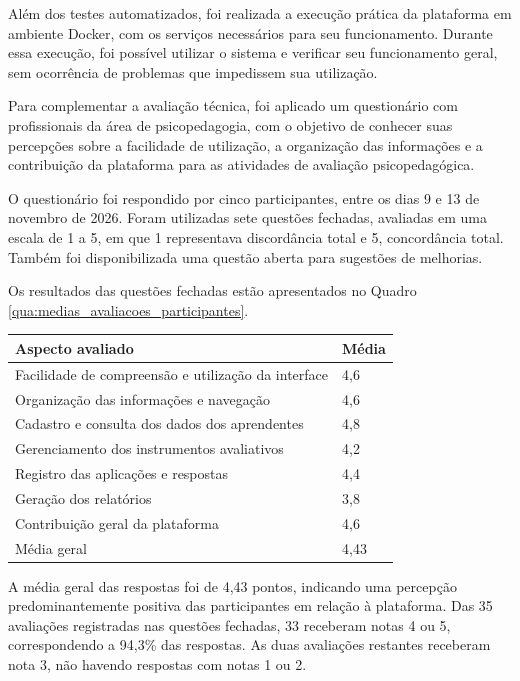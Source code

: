 Além dos testes automatizados, foi realizada a execução prática da plataforma em ambiente Docker, com os serviços necessários para seu funcionamento. Durante essa execução, foi possível utilizar o sistema e verificar seu funcionamento geral, sem ocorrência de problemas que impedissem sua utilização.

\label{sec:avaliacao_usuarios}Para complementar a avaliação técnica, foi aplicado um questionário com profissionais da área de psicopedagogia, com o objetivo de conhecer suas percepções sobre a facilidade de utilização, a organização das informações e a contribuição da plataforma para as atividades de avaliação psicopedagógica.

O questionário foi respondido por cinco participantes, entre os dias 9 e 13 de novembro de 2026. Foram utilizadas sete questões fechadas, avaliadas em uma escala de 1 a 5, em que 1 representava discordância total e 5, concordância total. Também foi disponibilizada uma questão aberta para sugestões de melhorias.

Os resultados das questões fechadas estão apresentados no Quadro \ref{qua:medias_avaliacoes_participantes}.

\begin{quadro}[H]
\centering
\small
\caption{Médias das avaliações dos participantes}
\begin{tabular}{p{13cm} p{2cm}}
\hline
\textbf{Aspecto avaliado} & \textbf{Média} \\
\hline
Facilidade de compreensão e utilização da interface & 4,6 \\
Organização das informações e navegação & 4,6 \\
Cadastro e consulta dos dados dos aprendentes & 4,8 \\
Gerenciamento dos instrumentos avaliativos & 4,2 \\
Registro das aplicações e respostas & 4,4 \\
Geração dos relatórios & 3,8 \\
Contribuição geral da plataforma & 4,6 \\
Média geral & 4,43 \\
\hline
\end{tabular}
\label{qua:medias_avaliacoes_participantes}
\end{quadro}

A média geral das respostas foi de 4,43 pontos, indicando uma percepção predominantemente positiva das participantes em relação à plataforma. Das 35 avaliações registradas nas questões fechadas, 33 receberam notas 4 ou 5, correspondendo a 94,3\% das respostas. As duas avaliações restantes receberam nota 3, não havendo respostas com notas 1 ou 2.

